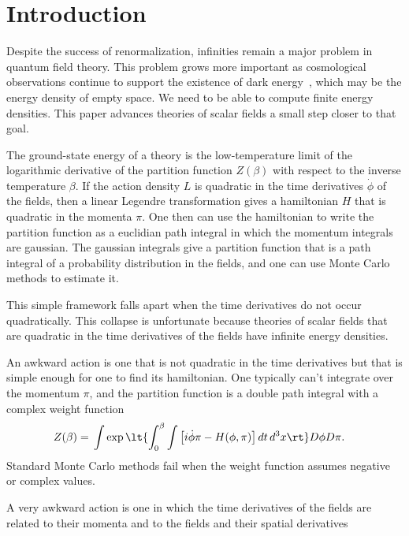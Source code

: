 \documentclass[prd,preprint,floatfix,showpacs]{revtex4-1}
\begin{document}
\section {Introduction
\label {Introduction} }
Despite the success of renormalization,
infinities remain a major problem
in quantum field theory. 
This problem
grows more important
as cosmological observations
continue to support the existence of 
dark energy~\cite{PlanckCosmologicalNA},
which may be the energy density 
of empty space.
We need to be able to compute 
finite energy densities. 
This paper advances
theories of scalar fields 
a small step closer to that goal.
\par
The ground-state energy
of a theory
is the low-temperature limit 
of the logarithmic derivative 
of the partition function \( Z(\beta) \)
with respect to the inverse temperature \( \beta \)\@.
If the action density \( L \) is quadratic
in the time derivatives \( \dot \phi \) 
of the fields,
then a linear Legendre transformation
gives a hamiltonian \( H \) that is
quadratic 
in the momenta \( \pi \)\@.
One then can use the hamiltonian
to write the partition function
as a euclidian path integral
in which the momentum integrals
are gaussian.
The gaussian integrals give
a partition function that is 
a path integral of a probability
distribution in the fields, and 
one can use Monte Carlo methods
to estimate it.
\par
This simple framework falls apart
when the time derivatives do not occur
quadratically.  
This collapse is unfortunate
because theories of scalar fields 
that are quadratic
in the time derivatives of the fields
have infinite energy densities.
\par
An awkward action is one that is not quadratic
in the time derivatives but that is simple
enough for one to find its hamiltonian.
One typically can't integrate over the momentum \( \pi \),
and the partition function is a double path integral
with a complex weight function
\begin{align} 
Z(\beta) ={}& 
\int \exp \lt\{ \int_0^\beta \int \left[ i \dot \phi \pi 
- H(\phi, \pi) \right] dt \, d^3x \rt\} D\phi D\pi .
\label {the path integral for the partition function}
\end{align}
Standard Monte Carlo methods fail
when the weight function assumes negative
or complex values. 
\par
A very awkward action is one
in which the time derivatives of the fields
are related to their momenta and to 
the fields and their spatial derivatives
\end{document}
